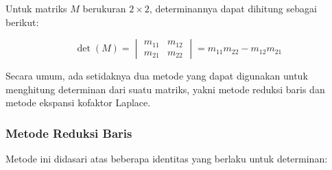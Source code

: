     Untuk matriks $M$ berukuran $2 \times 2$, determinannya dapat dihitung sebagai berikut:

    \[
        \det(M) = 
        \begin{vmatrix}
            m_{11} & m_{12} \\
            m_{21} & m_{22}
        \end{vmatrix}
        =
        m_{11} m_{22} - m_{12} m_{21}
    \]

    Secara umum, ada setidaknya dua metode yang dapat digunakan untuk menghitung determinan dari suatu matriks, yakni metode reduksi baris dan metode ekspansi kofaktor Laplace.

    \subsubsection{Metode Reduksi Baris}
        Metode ini didasari atas beberapa identitas yang berlaku untuk determinan:

